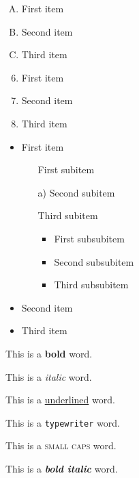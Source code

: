 \documentclass[10pt, letterpaper]{article}
\begin{document}
\vspace{1cm}

\begin{enumerate}[A.]
    \item First item
    \item Second item
    \item Third item
\end{enumerate}

\vspace{1cm}

\begin{enumerate} \setcounter{enumi}{5}
    \item First item
    \item Second item
    \item Third item
\end{enumerate}

\vspace{1cm}

\begin{itemize}
    \item First item
    \begin{itemize}
        \item[] First subitem
        \item[a)] Second subitem
        \item[] Third subitem
        \begin{itemize}
            \item First subsubitem
            \item Second subsubitem
            \item Third subsubitem
        \end{itemize}
    \end{itemize}
    \item Second item
    \item Third item
\end{itemize}


\pagebreak

This is a \textbf{bold} word.

This is a \textit{italic} word.

This is a \underline{underlined} word.

This is a \texttt{typewriter} word.

This is a \textsc{small caps} word.

This is a \textbf{\textit{bold italic}} word.

\vspace{1cm}
\end{document}
